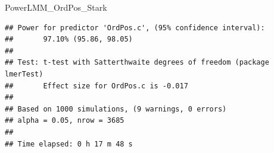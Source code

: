 \documentclass[
]{article}
\newenvironment{Shaded}{\begin{snugshade}}{\end{snugshade}}
\newcommand{\NormalTok}[1]{#1}
\begin{document}
\begin{Shaded}
\begin{Highlighting}[]
\NormalTok{PowerLMM\_OrdPos\_Stark}
\end{Highlighting}
\end{Shaded}

\begin{verbatim}
## Power for predictor 'OrdPos.c', (95% confidence interval):
##       97.10% (95.86, 98.05)
## 
## Test: t-test with Satterthwaite degrees of freedom (package lmerTest)
##       Effect size for OrdPos.c is -0.017
## 
## Based on 1000 simulations, (9 warnings, 0 errors)
## alpha = 0.05, nrow = 3685
## 
## Time elapsed: 0 h 17 m 48 s
\end{verbatim}
\end{document}
